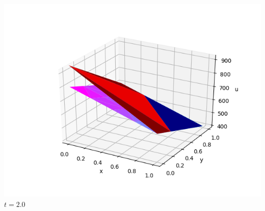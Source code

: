\documentclass[]{beamer}
\begin{document}
\begin{frame}[t]
\begin{columns}
\begin{center}
			\includegraphics[scale=0.2]{figures/2D_xy_ls1mat_u_vs_x_20}\\
			$t=2.0$
			\end{center}
	\end{columns}
\end{frame}
\end{document}
